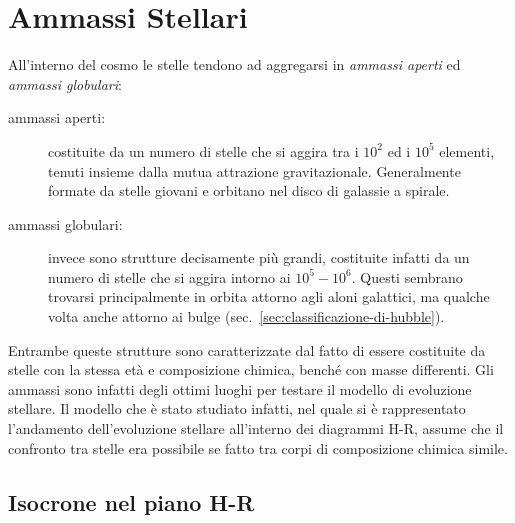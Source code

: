 \section{Ammassi Stellari}
All'interno del cosmo le stelle tendono ad aggregarsi in \textit{ammassi aperti} ed \textit{ammassi globulari}:

\begin{description}
\item[ammassi aperti:]costituite da un numero di stelle che si aggira tra i $10^2$ ed i $10^5$ elementi, tenuti insieme dalla mutua attrazione gravitazionale. Generalmente formate da stelle giovani e orbitano nel disco di galassie a spirale.
\item[ammassi globulari:]invece sono strutture decisamente più grandi, costituite infatti da un numero di stelle che si aggira intorno ai $10^5 - 10^6$. Questi sembrano trovarsi principalmente in orbita attorno agli aloni galattici, ma qualche volta anche attorno ai bulge (sec.~\ref{sec:classificazione-di-hubble}). 
\end{description}

Entrambe queste strutture sono caratterizzate dal fatto di essere costituite da stelle con la stessa età e composizione chimica, benché con masse differenti. Gli ammassi sono infatti degli ottimi luoghi per testare il modello di evoluzione stellare. Il modello che è stato studiato infatti, nel quale si è rappresentato l'andamento dell'evoluzione stellare all'interno dei diagrammi H-R, assume che il confronto tra stelle era possibile se fatto tra corpi di composizione chimica simile.

\begin{center}
\end{center}

\subsection{Isocrone nel piano H-R}\label{sec:isocrone}

